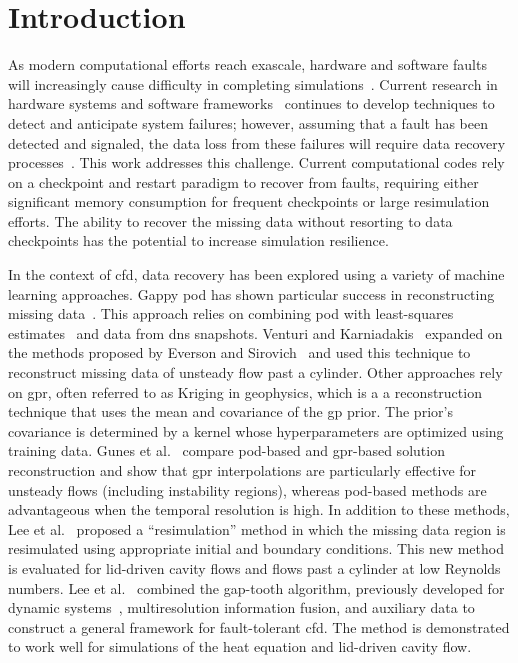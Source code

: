 \documentclass[review]{elsarticle}
\begin{document}
\glsresetall

\section{Introduction}
As modern computational efforts reach exascale, hardware and software
faults will increasingly cause difficulty in completing
simulations~\cite{Brown2010}. Current research in hardware systems and
software frameworks~\cite{Gropp2004, Hoemmen2011, Teranishi2014,
  Cappello2014, Gamell2015, Grout2017} continues to develop techniques
to detect and anticipate system failures; however, assuming that a
fault has been detected and signaled, the data loss from these
failures will require data recovery processes~\cite{Lee2015}. This
work addresses this challenge. Current computational codes rely
on a checkpoint and restart paradigm to recover from faults, requiring
either significant memory consumption for frequent checkpoints or
large resimulation efforts. The ability to recover the missing data
without resorting to data checkpoints has the potential to increase
simulation resilience.

In the context of \gls{cfd}, data recovery has been explored using a
variety of machine learning approaches. Gappy \gls{pod} has shown
particular success in reconstructing missing
data~\cite{Everson1995,Tan2003,Venturi2004}. This approach relies on
combining \gls{pod} with least-squares estimates~\cite{Yates1933,
  Little2002} and data from \acrlong{dns} snapshots. Venturi and
Karniadakis~\cite{Venturi2004} expanded on the methods proposed by
Everson and Sirovich~\cite{Everson1995} and used this technique to
reconstruct missing data of unsteady flow past a cylinder. Other
approaches rely on \gls{gpr}, often referred to as Kriging in
geophysics, which is a a reconstruction technique that uses the mean and
covariance of the \acrlong{gp} prior. The prior's covariance is determined
by a kernel whose hyperparameters are optimized using training
data. Gunes et al.~\cite{Gunes2006} compare \gls{pod}-based and
\gls{gpr}-based solution reconstruction and show that \gls{gpr}
interpolations are particularly effective for unsteady flows
(including instability regions), whereas \gls{pod}-based methods are
advantageous when the temporal resolution is high. In addition to
these methods, Lee et al.~\cite{Lee2015} proposed a ``resimulation''
method in which the missing data region is resimulated using
appropriate initial and boundary conditions. This new method is
evaluated for lid-driven cavity flows and flows past a cylinder at low
Reynolds numbers. Lee et al.~\cite{Lee2017} combined the gap-tooth
algorithm, previously developed for dynamic systems~\cite{Gear2003},
multiresolution information fusion, and auxiliary data to construct a
general framework for fault-tolerant \gls{cfd}. The method is
demonstrated to work well for simulations of the heat equation and
lid-driven cavity flow.
\end{document}
